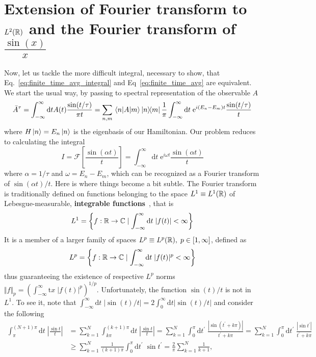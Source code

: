 \section{Extension of Fourier transform to \(L^2(\mathbb{R})\) and the Fourier transform of \(\frac{\sin(x)}{x}\)}
Now, let us tackle the more difficult integral, necessary to show, that Eq.~\eqref{eq:finite_time_avg_integral}
and Eq~\eqref{eq:finite_time_avg} are equivalent. We start the usual way, by passing to spectral representation
of the observable \(A\)
\begin{equation}
    \bar{A}^{\tau} = \int_{-\infty}^{\infty} \mathrm{d}t A(t) \frac{\sin (t/\tau )}{\pi t}
    = \sum_{n,m}  \matrixel{n}{A}{m} \ketbra{n}{m} \frac{1}{\pi } \int_{-\infty}^{\infty} \mathrm{d}t\;
    \mathrm{e}^{i (E_n-E_m) t} \frac{\sin (t/\tau )}{t}
    \label{eq:b1}
\end{equation}
where \(H\ket{n} = E_n \ket{n}\) is the eigenbasis of our Hamiltonian. Our problem reduces to calculating
the integral
\begin{equation}
    I =\mathcal{F}\left[ \frac{\sin (\alpha t)}{t} \right]=  \int_{-\infty}^{\infty} \mathrm{d}t\; \mathrm{e}^{i \omega  t} \frac{\sin (\alpha  t )}{t}
\end{equation}
where \(\alpha = 1/\tau\) and \(\omega = E_n-E_m\), which can be recognized as a Fourier transform of
\(\sin (\alpha  t )/t\). Here is where things become a bit subtle. The Fourier transform is traditionally
defined on functions belonging to the space \(L^1 \equiv L^1(\mathbb{R})\) of Lebesgue-measurable, \textbf{integrable
    functions}~\autocite{Rudin1987}, that is
\begin{equation}
    L^1 = \left\{f:\mathbb{R} \to \mathbb{C} \mid \int_{-\infty}^{\infty} \mathrm{d}t \; |f(t)| < \infty \right\}
\end{equation}
It is a member of a larger family of spaces \(L^p \equiv L^p(\mathbb{R}),\; p \in \left[ 1,\infty  \right] \), defined as
\begin{equation}
    L^p = \left\{f:\mathbb{R} \to \mathbb{C} \mid \int_{-\infty}^{\infty} \mathrm{d}t \; |f(t)|^p < \infty \right\}
\end{equation}
thus guaranteeing the existence of respective \(L^p\) norms \(\Vert f \Vert_p = \left(\int_{-\infty}^{\infty} \mathrm{t}x \; |f(t)|^p \right)^{1/p}\).
Unfortunately, the function \(\sin (t)/t\) is not in \(L^1\). To see it, note that
\(\int_{-\infty}^{\infty} \mathrm{d}t\; \vert \sin (t)/t \vert = 2 \int_{0}^{\infty} \mathrm{d}t \vert \sin (t)/t \vert  \)
and consider the following
\begin{align*}
    \int_{\pi}^{(N+1)\pi}\mathrm{d}t\;  \left|\frac{\sin t}{t}\right| & =\sum_{k=1}^N\int_{k\pi}^{(k+1)\pi}\mathrm{d}t \;\left|\frac{\sin t}t\right|
    =\sum_{k=1}^N\int_0^{\pi}\mathrm{d}t^{\prime}  \;\frac{|\sin(t^{\prime} +k\pi)|}{t^{\prime} +k\pi}
    =\sum_{k=1}^N\int_0^{\pi}\mathrm{d}t^{\prime}  \;\frac{|\sin t^{\prime} |}{t^{\prime} +k\pi}                                                                                 \\\
                                                                    & \geq \sum_{k=1}^N\frac 1{(k+1)\pi}\int_0^{\pi}\mathrm{d}t^{\prime} \;  \sin t^{\prime} 
    =\frac 2{\pi}\sum_{k=1}^N\frac 1{k+1},
\end{align*}
